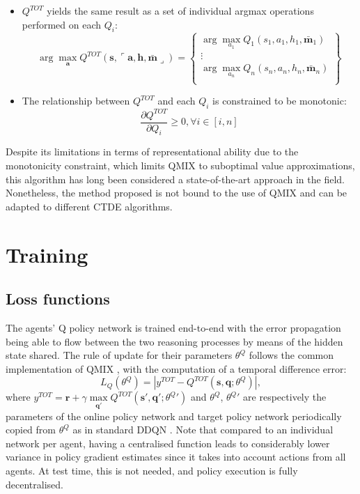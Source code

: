 \documentclass[a4paper,singleside,12pt]{report} %
\begin{document}
\begin{itemize}
\item
  \(Q^{TOT}\) yields the same result as a set of individual argmax operations performed on each \(Q_i\):
  \begin{equation}
  \arg\max_{\textbf{a}} Q^{TOT}(\textbf{s},\ulcorner\textbf{a},\textbf{h},\bar{\textbf{m}}\lrcorner) = \begin{Bmatrix}
  \arg\max_{a_1} Q_1(s_1,a_1,h_1,\bar{\textbf{m}}_1) \\
  \vdots\\
  \arg\max_{a_n} Q_n(s_n,a_n,h_n,\bar{\textbf{m}}_n) \\
  \end{Bmatrix}
  \end{equation}
\item
  The relationship between \(Q^{TOT}\) and each \(Q_i\) is constrained to be monotonic:
  \begin{equation}
  \frac{\partial Q^{TOT}}{\partial Q_i} \geq 0, \forall i \in [i,n]
  \end{equation}
\end{itemize}

Despite its limitations in terms of representational ability due to the monotonicity constraint, which limits QMIX to suboptimal value approximations, this algorithm has long been considered a state-of-the-art approach in the field. Nonetheless, the method proposed is not bound to the use of QMIX and can be adapted to different CTDE algorithms.

\section{Training}\label{training}

\subsection{Loss functions}\label{loss}
The agents' Q policy network is trained end-to-end with the error propagation being able to flow between the two reasoning processes by means of the hidden state shared. The rule of update for their parameters \(\theta^Q\) follows the common implementation of QMIX \cite{Rashid2018QMIXMV}, with the computation of a temporal difference error:
  \begin{equation}
    L_Q(\theta^Q) = |y^{TOT} - Q^{TOT}(\textbf{s}, \textbf{q}; \theta^Q)|,
  \end{equation}
where $y^{TOT} = \textbf{r} + \gamma \max\limits_{\textbf{q}'}Q^{TOT}(\textbf{s}', \textbf{q}'; \theta^{Q}{'})$ and \(\theta^Q\), \(\theta^{Q}{'}\) are respectively the parameters of the online policy network and target policy network periodically copied from \(\theta^Q\) as in standard DDQN \cite{Van2016deep}. Note that compared to an individual network per agent, having a centralised function leads to considerably lower variance in policy gradient estimates since it takes into account actions from all agents. At test time, this is not needed, and policy execution is fully decentralised.
\end{document}

